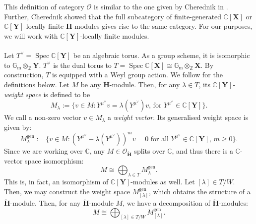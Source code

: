 \documentclass[a4paper]{report}
\theoremstyle{theorem}
\theoremstyle{definition}
\theoremstyle{remark}
\theoremstyle{proposition}
\theoremstyle{conjecture}
\theoremstyle{lemma}
\theoremstyle{corollary}
\theoremstyle{exercise}
\theoremstyle{example}
\newcommand{\C}{\mathbb{C}}
\newcommand{\mcal}{\mathcal}
\newcommand{\on}{\operatorname}
\newcommand{\spec}{\on{Spec}}
\begin{document}
  This definition of category $\mcal{O}$ is similar to the one given by Cherednik
  in \cite[\S 6]{che03}. Further, Cherednik showed that 
  the full subcategory of finite-generated $\C[\mathbf{X}]$ or 
  $\C[\mathbf{Y}]$-locally finite $\mathbf{\ddot{\mathbf{H}}}$-modules gives rise 
  to the same category. For our purposes, we will work with 
  $\C[\mathbf{Y}]$-locally finite modules.\\\\
  Let $T^\vee = \spec \C[\mathbf{Y}]$ be an algebraic torus. As a group scheme,
  it is isomorphic to $\mathbb{G}_{\on{m}}\otimes_{\mathbb{Z}} \mathbf{Y}$.
  $T^\vee$ is the dual torus to 
  $T = \spec \C[\mathbf{X}] \cong \mathbb{G}_{\on{m}} \otimes_{\mathbb{Z}} \mathbf{X}$.
  By construction, $T$ 
  is equipped with a Weyl group action. 
  We follow \cite[\S 5]{jv19} for the definitions below.
  Let $M$ be any $\mathbf{\ddot{\mathbf{H}}}$-module. Then, for any $\lambda \in T$, 
  its \emph{$\C[\mathbf{Y}]$-weight space} is defined to be 
  $$M_\lambda := \lbrace v \in M : \text{$Y^{\mu^\vee} v = \lambda(Y^{\mu^\vee})v$, for $Y^{\mu^\vee} \in \C[\mathbf{Y}]$}\rbrace.$$ 
  We call a non-zero vector $v\in M_\lambda$ a \emph{weight vector}. 
  Its generalised weight space is given by:
  $$M_\lambda^{\on{gen}} := \lbrace v\in M : \text{$(Y^{\mu^\vee}-\lambda(Y^{\mu^\vee}))^mv = 0$ for all $Y^{\mu^\vee} \in \C[\mathbf{Y}]$, $m\geq 0$}\rbrace.$$
  Since we are working over $\C$, any  $M \in \mcal{O}_{\mathbf{\ddot{\mathbf{H}}}}$
  splits over $\C$, and thus there is a $\C$-vector space isomorphism:
  $$M \cong \bigoplus_{\lambda \in T}  M_\lambda^{\on{gen}}.$$
  This is, in fact, an isomorphism of $\C[\mathbf{Y}]$-modules as well. 
  Let $[\lambda] \in T/W$. Then, we may construct the weight space 
  $M_{[\lambda]}^{\on{gen}}$, which obtains the structure of a 
  $\mathbf{\ddot{\mathbf{H}}}$-module. Then, for any $\ddot{\mathbf{H}}$-module $M$,
  we have a decomposition of $\mathbf{\ddot{\mathbf{H}}}$-modules:
  $$M \cong \bigoplus_{[\lambda]\in T/W} M_{[\lambda]}^{\on{gen}}.$$
  
\end{document}
